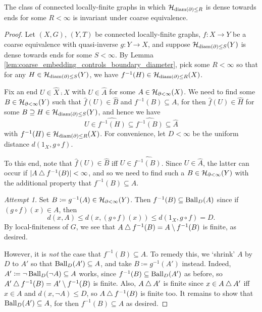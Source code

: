 \documentclass{amsart}
\begin{document}
    \begin{proposition}\label{prp:invariant_of_density_coarse_equivalence}
        The class of connected locally-finite graphs in which $\mathcal{H}_{\operatorname{diam}(\partial)\leq R}$ is dense towards ends for some $R<\infty$ is invariant under coarse equivalence.
    \end{proposition}
    \begin{proof}
        Let $(X,G)$, $(Y,T)$ be connected locally-finite graphs, $f:X\to Y$ be a coarse equivalence with quasi-inverse $g:Y\to X$, and suppose $\mathcal{H}_{\operatorname{diam}(\partial)\leq S}(Y)$ is dense towards ends for some $S<\infty$. By Lemma \ref{lem:coarse_embedding_controls_boundary_diameter}, pick some $R<\infty$ so that for any $H\in\mathcal{H}_{\operatorname{diam}(\partial)\leq S}(Y)$, we have $f^{-1}(H)\in\mathcal{H}_{\operatorname{diam}(\partial)\leq R}(X)$.

        Fix an end $U\in\widehat{X}\comp X$ with $U\in\widehat{A}$ for some $A\in\mathcal{H}_{\partial<\infty}(X)$. We need to find some $B\in\mathcal{H}_{\partial<\infty}(Y)$ such that $\widehat{f}(U)\in\widehat{B}$ and $f^{-1}(B)\subseteq A$, for then $\widehat{f}(U)\in\widehat{H}$ for some $B\supseteq H\in\mathcal{H}_{\operatorname{diam}(\partial)\leq S}(Y)$, and hence we have
        \begin{equation*}
            U\in\widehat{f^{-1}(H)}\subseteq\widehat{f^{-1}(B)}\subseteq\widehat{A}
        \end{equation*}
        with $f^{-1}(H)\in\mathcal{H}_{\operatorname{diam}(\partial)\leq R}(X)$. For convenience, let $D<\infty$ be the uniform distance $d(1_X,g\circ f)$.

        To this end, note that $\widehat{f}(U)\in\widehat{B}$ iff $U\in\widehat{f^{-1}(B)}$. Since $U\in\widehat{A}$, the latter can occur if $|A\bigtriangleup f^{-1}(B)|<\infty$, and so we need to find such a $B\in\mathcal{H}_{\partial<\infty}(Y)$ with the additional property that $f^{-1}(B)\subseteq A$.
        \begin{leftbar}
            \textit{Attempt 1.} Set $B\coloneqq g^{-1}(A)\in\mathcal{H}_{\partial<\infty}(Y)$. Then $f^{-1}(B)\subseteq\operatorname{Ball}_D(A)$ since if $(g\circ f)(x)\in A$, then
                \begin{equation*}
                    d(x,A)\leq d(x,(g\circ f)(x))\leq d(1_X,g\circ f)=D.
                \end{equation*}
            By local-finiteness of $G$, we see that $A\bigtriangleup f^{-1}(B)=A\setminus f^{-1}(B)$ is finite, as desired.
        \end{leftbar}
        However, it is \textit{not} the case that $f^{-1}(B)\subseteq A$. To remedy this, we `shrink' $A$ by $D$ to $A'$ so that $\operatorname{Ball}_D(A')\subseteq A$, and take $B\coloneqq g^{-1}(A')$ instead. Indeed, $A'\coloneqq\lnot\operatorname{Ball}_D(\lnot A)\subseteq A$ works, since $f^{-1}(B)\subseteq\operatorname{Ball}_D(A')$ as before, so $A'\bigtriangleup f^{-1}(B)=A'\setminus f^{-1}(B)$ is finite. Also, $A\bigtriangleup A'$ is finite since $x\in A\bigtriangleup A'$ iff $x\in A$ and $d(x,\lnot A)\leq D$, so $A\bigtriangleup f^{-1}(B)$ is finite too. It remains to show that $\operatorname{Ball}_D(A')\subseteq A$, for then $f^{-1}(B)\subseteq A$ as desired.


\end{proof}
\end{document}
